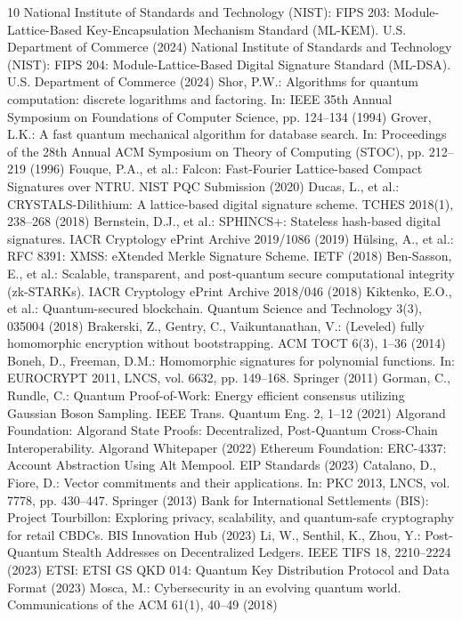 \documentclass[runningheads]{llncs}
\begin{document}
\begin{thebibliography}{10}
 National Institute of Standards and Technology (NIST): FIPS 203: Module-Lattice-Based Key-Encapsulation Mechanism Standard (ML-KEM). U.S. Department of Commerce (2024)
 National Institute of Standards and Technology (NIST): FIPS 204: Module-Lattice-Based Digital Signature Standard (ML-DSA). U.S. Department of Commerce (2024)
 Shor, P.W.: Algorithms for quantum computation: discrete logarithms and factoring. In: IEEE 35th Annual Symposium on Foundations of Computer Science, pp. 124--134 (1994)
 Grover, L.K.: A fast quantum mechanical algorithm for database search. In: Proceedings of the 28th Annual ACM Symposium on Theory of Computing (STOC), pp. 212--219 (1996)
 Fouque, P.A., et al.: Falcon: Fast-Fourier Lattice-based Compact Signatures over NTRU. NIST PQC Submission (2020)
 Ducas, L., et al.: CRYSTALS-Dilithium: A lattice-based digital signature scheme. TCHES 2018(1), 238--268 (2018)
 Bernstein, D.J., et al.: SPHINCS+: Stateless hash-based digital signatures. IACR Cryptology ePrint Archive 2019/1086 (2019)
 Hülsing, A., et al.: RFC 8391: XMSS: eXtended Merkle Signature Scheme. IETF (2018)
 Ben-Sasson, E., et al.: Scalable, transparent, and post-quantum secure computational integrity (zk-STARKs). IACR Cryptology ePrint Archive 2018/046 (2018)
 Kiktenko, E.O., et al.: Quantum-secured blockchain. Quantum Science and Technology 3(3), 035004 (2018)
 Brakerski, Z., Gentry, C., Vaikuntanathan, V.: (Leveled) fully homomorphic encryption without bootstrapping. ACM TOCT 6(3), 1--36 (2014)
 Boneh, D., Freeman, D.M.: Homomorphic signatures for polynomial functions. In: EUROCRYPT 2011, LNCS, vol. 6632, pp. 149--168. Springer (2011)
 Gorman, C., Rundle, C.: Quantum Proof-of-Work: Energy efficient consensus utilizing Gaussian Boson Sampling. IEEE Trans. Quantum Eng. 2, 1--12 (2021)
 Algorand Foundation: Algorand State Proofs: Decentralized, Post-Quantum Cross-Chain Interoperability. Algorand Whitepaper (2022)
 Ethereum Foundation: ERC-4337: Account Abstraction Using Alt Mempool. EIP Standards (2023)
 Catalano, D., Fiore, D.: Vector commitments and their applications. In: PKC 2013, LNCS, vol. 7778, pp. 430--447. Springer (2013)
 Bank for International Settlements (BIS): Project Tourbillon: Exploring privacy, scalability, and quantum-safe cryptography for retail CBDCs. BIS Innovation Hub (2023)
 Li, W., Senthil, K., Zhou, Y.: Post-Quantum Stealth Addresses on Decentralized Ledgers. IEEE TIFS 18, 2210--2224 (2023)
 ETSI: ETSI GS QKD 014: Quantum Key Distribution Protocol and Data Format (2023)
 Mosca, M.: Cybersecurity in an evolving quantum world. Communications of the ACM 61(1), 40--49 (2018)
\end{thebibliography}
\end{document}
